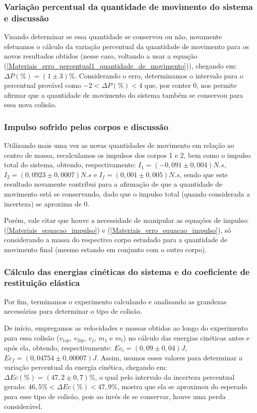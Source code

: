 \documentclass[12pt, twoside]{article}
\begin{document}
\subsubsection{Variação percentual da quantidade de movimento do sistema e discussão}

    Visando determinar se essa quantidade se conservou ou não, novamente efetuamos o cálculo da variação percentual da quantidade de movimento para os novos resultados obtidos (nesse caso, voltando a usar a equação (\ref{Materiais_erro_percentual1_quantidade_de_movimento})), chegando em: $\Delta P(\%) = (1 \pm 3)\%$. Considerando o erro, determinamos o intervalo para o percentual provável como $-2 < \Delta P(\%) < 4$ que, por conter $0$, nos permite afirmar que a quantidade de movimento do sistema também se conservou para essa nova colisão.

\subsubsection{Impulso sofrido pelos corpos e discussão}

    Utilizando mais uma vez as novas quantidades de movimento em relação ao centro de massa, recalculamos os impulsos dos corpos 1 e 2, bem como o impulso total do sistema, obtendo, respectivamente: $I_1 = (-0,091 \pm 0,004)N.s$,  $I_2 = (0,0923 \pm 0,0007)N.s$ e $I_f = (0,001 \pm 0,005)N.s$, sendo que este resultado novamente contribui para a afirmação de que a quantidade de movimento está se conservando, dado que o impulso total (quando considerada a incerteza) se aproxima de $0$.

    Porém, vale citar que houve a necessidade de manipular as equações de impulso: (\ref{Materiais_equacao_impulso}) e (\ref{Materiais_erro_equacao_impulso}), só considerando a massa do respectivo corpo estudado para a quantidade de movimento final (mesmo estando em conjunto com o outro corpo).

\subsubsection{Cálculo das energias cinéticas do sistema e do coeficiente de restituição elástica} %

    Por fim, terminamos o experimento calculando e analisando as grandezas necessárias para determinar o tipo de colisão.
    
    De início, empregamos as velocidades e massas obtidas ao longo do experimento para essa colisão ($v_{1ip}$, $v_{2ip}$, $v_j$, $m_1$ e $m_t$) no cálculo das energias cinéticas antes e após ela, obtendo, respectivamente: $Ec_{i} = (0,09 \pm 0,04)J$, $Ec_{f} = (0,04754 \pm 0,00007)J$. Assim, usamos esses valores para determinar a variação percentual da energia cinética, chegando em: $\Delta Ec(\%) = (47,2 \pm 0,7)\%$, o qual pelo intervalo da incerteza percentual gerado: $46,5 \% < \Delta Ec(\%) < 47,9 \%$, mostra que ela se aproximou do esperado para esse tipo de colisão, pois ao invés de se conservar, houve uma perda considerável.
\end{document}
